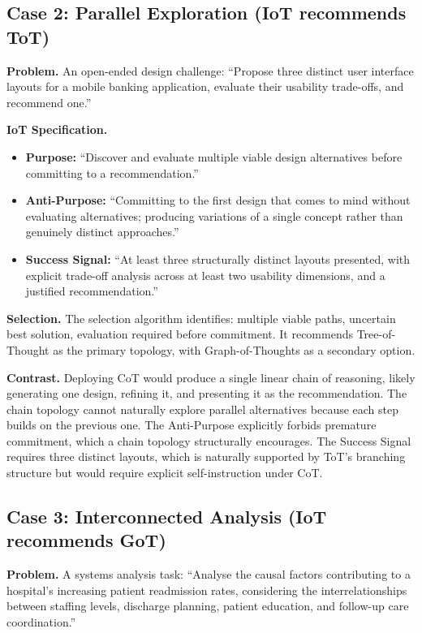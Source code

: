 \documentclass[11pt,a4paper]{article}
\begin{document}
\subsection{Case 2: Parallel Exploration (IoT recommends ToT)}

\textbf{Problem.} An open-ended design challenge: ``Propose three distinct user interface layouts for a mobile banking application, evaluate their usability trade-offs, and recommend one.''

\textbf{IoT Specification.}
\begin{itemize}
  \item \textbf{Purpose:} ``Discover and evaluate multiple viable design alternatives before committing to a recommendation.''
  \item \textbf{Anti-Purpose:} ``Committing to the first design that comes to mind without evaluating alternatives; producing variations of a single concept rather than genuinely distinct approaches.''
  \item \textbf{Success Signal:} ``At least three structurally distinct layouts presented, with explicit trade-off analysis across at least two usability dimensions, and a justified recommendation.''
\end{itemize}

\textbf{Selection.} The selection algorithm identifies: multiple viable paths, uncertain best solution, evaluation required before commitment. It recommends Tree-of-Thought as the primary topology, with Graph-of-Thoughts as a secondary option.

\textbf{Contrast.} Deploying CoT would produce a single linear chain of reasoning, likely generating one design, refining it, and presenting it as the recommendation. The chain topology cannot naturally explore parallel alternatives because each step builds on the previous one. The Anti-Purpose explicitly forbids premature commitment, which a chain topology structurally encourages. The Success Signal requires three distinct layouts, which is naturally supported by ToT's branching structure but would require explicit self-instruction under CoT.

\subsection{Case 3: Interconnected Analysis (IoT recommends GoT)}

\textbf{Problem.} A systems analysis task: ``Analyse the causal factors contributing to a hospital's increasing patient readmission rates, considering the interrelationships between staffing levels, discharge planning, patient education, and follow-up care coordination.''
\end{document}
